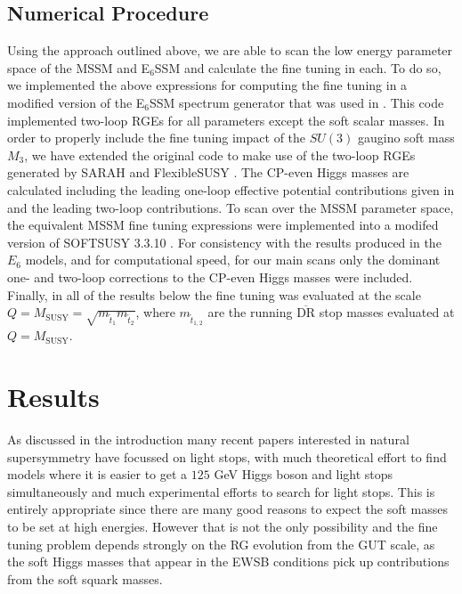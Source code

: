 \documentclass[preprint,amsmath,amssymb,aps,superscriptaddress,prd,showpacs,floatfix,nofootinbib]{revtex4-1}
\begin{document}
\subsection{\label{subsec:numericalprocedure}Numerical Procedure}
Using the approach outlined above, we are able to scan the low energy
parameter space of the MSSM and E$_6$SSM and calculate the fine tuning
in each. To do so, we implemented the above expressions for computing
the fine tuning in a modified version of the E$_6$SSM spectrum
generator that was used in \cite{Athron:2013ipa}. This code
implemented two-loop RGEs for all parameters except the soft scalar
masses. In order to properly include the fine tuning impact of the
$SU(3)$ gaugino soft mass $M_3$, we have extended the original code to
make use of the two-loop RGEs generated by SARAH
\cite{Staub:2009bi,Staub:2010jh,Staub:2012pb,Staub:2013tta} and
FlexibleSUSY \cite{Athron:2014yba}. The CP-even Higgs masses are
calculated including the leading one-loop effective potential
contributions given in \cite{Athron:2009bs} and the leading two-loop
contributions. To scan over the MSSM parameter space, the equivalent
MSSM fine tuning expressions were implemented into a modifed version
of SOFTSUSY 3.3.10 \cite{Allanach:2001kg,Allanach:2013kza}. For
consistency with the results produced in the $E_6$ models, and for
computational speed, for our main scans only the dominant one- and
two-loop corrections to the CP-even Higgs masses were
included. Finally, in all of the results below the fine tuning was
evaluated at the scale
$Q=M_{\textrm{SUSY}}=\sqrt{m_{\tilde{t}_1}m_{\tilde{t}_2}}$, where
$m_{\tilde{t}_{1,2}}$ are the running $\overline{\textrm{DR}}$ stop
masses evaluated at $Q=M_{\textrm{SUSY}}$.

\section{\label{sec:results}Results}
As discussed in the introduction many recent papers interested in
natural supersymmetry have focussed on light stops, with much
theoretical effort to find models where it is easier to get a $125$
GeV Higgs boson and light stops simultaneously and much experimental
efforts to search for light stops.  This is entirely appropriate since
there are many good reasons to expect the soft masses to be set at
high energies.  However that is not the only possibility and the fine
tuning problem depends strongly on the RG evolution from the GUT
scale, as the soft Higgs masses that appear in the EWSB conditions
pick up contributions from the soft squark masses.
\end{document}
